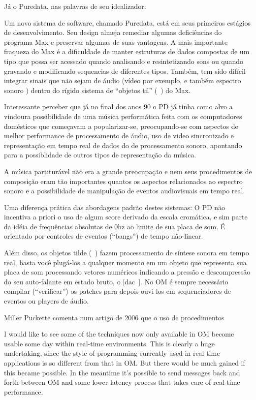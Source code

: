 \documentclass[
	12pt,				%
	openright,			%
	twoside,			%
	a4paper,			%
	english,			%
	french,				%
	spanish,			%
	brazil				%
	]{abntex2}
\begin{document}
Já o Puredata, nas palavras de seu idealizador:

\begin{citacao}
Um novo sistema de software, chamado Puredata, está em seus primeiros estágios de desenvolvimento. Seu design almeja remediar algumas deficiências do programa Max e preservar algumas de suas vantagens. A mais importante fraqueza do Max é a dificuldade de manter estruturas de dados compostas de um tipo que possa ser acessado quando analisando e resintetizando sons  ou quando gravando e modificando sequencias de diferentes tipos. Também, tem sido difícil integrar sinais que não sejam de áudio (vídeo por exemplo, e também espectro sonoro ) dentro do rígido sistema de “objetos til” (~) do Max.\cite{puckette1996pure}
\end{citacao}
 

Interessante perceber que já no final dos anos 90 o PD já tinha como alvo a vindoura possibilidade de uma música performática feita com os computadores domésticos que começavam a popularizar-se, preocupando-se com aspectos de melhor performance de processamento de áudio, uso de video sincronizado e representação em tempo real de dados do de processamento sonoro, apontando para a possiblidade de outros tipos de representação da música. 

A música partiturável não era a grande preocupação e nem seus procedimentos de composição eram tão importantes quantos os aspectos relacionados ao espectro sonoro e a possibilidade de manipulação de eventos audiovisuais em tempo real.

Uma diferença prática das abordagens padrão destes sistemas: O PD não incentiva a priori o uso de algum score derivado da escala cromática, e sim parte da idéia de frequências absolutas de 0hz ao limite de sua placa de som. É orientado por controles de eventos (“bangs”) de tempo não-linear.

Além disso, os objetos tilde (~) fazem processamento de síntese sonora em tempo real, basta você plugá-los a qualquer momento em um objeto que representa sua placa de som processando vetores numéricos indicando a pressão e descompressão do seu auto-falante em estado bruto, o [dac~]. No OM é sempre necessário compilar (“verificar”) os patches para depois ouvi-los em sequenciadores de eventos ou players de áudio.

Miller Puckette comenta num artigo de 2006 que o uso de procedimentos 

I would like to see some of the techniques now only available in OM become usable some day within
real-time environments. This is clearly a huge undertaking, since the style of programming currently used
in real-time applications is so different from that in OM. But there would be much gained if this became
possible. In the meantime it’s possible to send messages back and forth between OM and some lower latency process that takes care of real-time performance. 
\cite{puckettecomputing}
\end{document}

